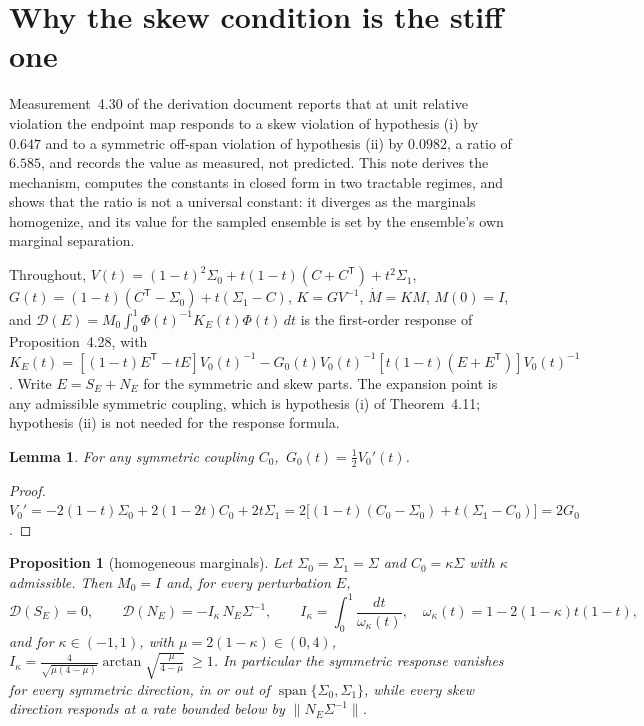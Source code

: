 \documentclass[11pt]{article}
\newcommand{\T}{\mathsf{T}}
\newcommand{\spn}{\operatorname{span}}
\newtheorem{proposition}{Proposition}
\newtheorem{lemma}{Lemma}
\theoremstyle{remark}
\begin{document}
\section*{Why the skew condition is the stiff one}

Measurement~4.30 of the derivation document reports that at unit relative violation the
endpoint map responds to a skew violation of hypothesis (i) by $0.647$ and to a symmetric
off-span violation of hypothesis (ii) by $0.0982$, a ratio of $6.585$, and records the value as
measured, not predicted. This note derives the mechanism, computes the constants in closed form
in two tractable regimes, and shows that the ratio is not a universal constant: it diverges as
the marginals homogenize, and its value for the sampled ensemble is set by the ensemble's own
marginal separation.

Throughout, $V(t)=(1-t)^2\Sigma_0+t(1-t)(C+C^{\T})+t^2\Sigma_1$,
$G(t)=(1-t)(C^{\T}-\Sigma_0)+t(\Sigma_1-C)$, $K=GV^{-1}$, $\dot M=KM$, $M(0)=I$, and
$\mathcal D(E)=M_0\int_0^1\Phi(t)^{-1}K_E(t)\Phi(t)\,dt$ is the first-order response of
Proposition~4.28, with
$K_E(t)=[(1-t)E^{\T}-tE]V_0(t)^{-1}-G_0(t)V_0(t)^{-1}[t(1-t)(E+E^{\T})]V_0(t)^{-1}$.
Write $E=S_E+N_E$ for the symmetric and skew parts. The expansion point is any admissible
symmetric coupling, which is hypothesis (i) of Theorem~4.11; hypothesis (ii) is not needed for
the response formula.

\begin{lemma}\label{lem:gv}
For any symmetric coupling $C_0$, $\,G_0(t)=\tfrac12 V_0'(t)$.
\end{lemma}

\begin{proof}
$V_0'=-2(1-t)\Sigma_0+2(1-2t)C_0+2t\Sigma_1
=2\big[(1-t)(C_0-\Sigma_0)+t(\Sigma_1-C_0)\big]=2G_0$.
\end{proof}

\begin{proposition}[homogeneous marginals]\label{prop:homog}
Let $\Sigma_0=\Sigma_1=\Sigma$ and $C_0=\kappa\Sigma$ with $\kappa$ admissible. Then $M_0=I$ and,
for every perturbation $E$,
\[
\mathcal D(S_E)=0,
\qquad
\mathcal D(N_E)=-I_\kappa\,N_E\Sigma^{-1},
\qquad
I_\kappa=\int_0^1\frac{dt}{\omega_\kappa(t)},
\quad
\omega_\kappa(t)=1-2(1-\kappa)t(1-t),
\]
and for $\kappa\in(-1,1)$, with $\mu=2(1-\kappa)\in(0,4)$,
$I_\kappa=\tfrac{4}{\sqrt{\mu(4-\mu)}}\arctan\sqrt{\tfrac{\mu}{4-\mu}}\ \ge1$.
In particular the symmetric response vanishes for \emph{every} symmetric direction, in or out of
$\spn\{\Sigma_0,\Sigma_1\}$, while every skew direction responds at a rate bounded below by
$\|N_E\Sigma^{-1}\|$.
\end{proposition}
\end{document}
